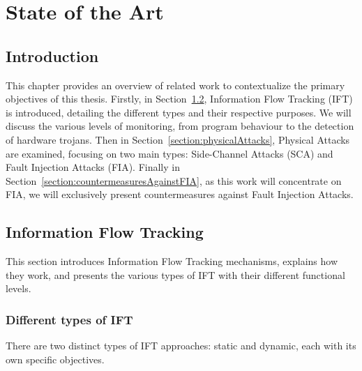 \chapter{State of the Art}
\label{chapter:soa}
\minitoc

\section{Introduction}
This chapter provides an overview of related work to contextualize the primary objectives of this thesis. Firstly, in Section~\ref{section:ift}, Information Flow Tracking (IFT) is introduced, detailing the different types and their respective purposes. We will discuss the various levels of monitoring, from program behaviour to the detection of hardware trojans.
Then in Section~\ref{section:physicalAttacks}, Physical Attacks are examined, focusing on two main types: Side-Channel Attacks (SCA) and Fault Injection Attacks (FIA).
Finally in Section~\ref{section:countermeasuresAgainstFIA}, as this work will concentrate on FIA, we will exclusively present countermeasures against Fault Injection Attacks.

\section{Information Flow Tracking}
\label{section:ift}
This section introduces Information Flow Tracking mechanisms, explains how they work, and presents the various types of IFT with their different functional levels.
    
\subsection{Different types of IFT}
There are two distinct types of IFT approaches: static and dynamic, each with its own specific objectives.

